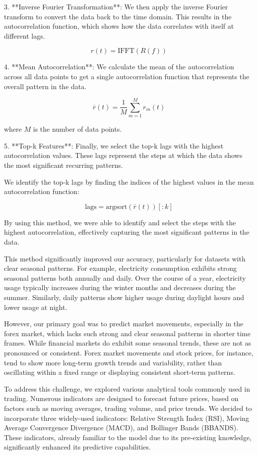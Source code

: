 3. **Inverse Fourier Transformation**: We then apply the inverse Fourier transform to convert the data back to the time domain. This results in the autocorrelation function, which shows how the data correlates with itself at different lags.

\[
	r(t) = \text{IFFT}(R(f))
\]

4. **Mean Autocorrelation**: We calculate the mean of the autocorrelation across all data points to get a single autocorrelation function that represents the overall pattern in the data.

\[
	\bar{r}(t) = \frac{1}{M} \sum_{m=1}^{M} r_m(t)
\]

where \( M \) is the number of data points.

5. **Top-k Features**: Finally, we select the top-k lags with the highest autocorrelation values. These lags represent the steps at which the data shows the most significant recurring patterns.

We identify the top-k lags by finding the indices of the highest values in the mean autocorrelation function:

\[
	\text{lags} = \text{argsort}(\bar{r}(t))[:k]
\]

By using this method, we were able to identify and select the steps with the highest autocorrelation, effectively capturing the most significant patterns in the data.

This method significantly improved our accuracy, particularly for datasets with clear seasonal patterns. For example, electricity consumption exhibits strong seasonal patterns both annually and daily. Over the course of a year, electricity usage typically increases during the winter months and decreases during the summer. Similarly, daily patterns show higher usage during daylight hours and lower usage at night.

However, our primary goal was to predict market movements, especially in the forex market, which lacks such strong and clear seasonal patterns in shorter time frames. While financial markets do exhibit some seasonal trends, these are not as pronounced or consistent. Forex market movements and stock prices, for instance, tend to show more long-term growth trends and variability, rather than oscillating within a fixed range or displaying consistent short-term patterns.

To address this challenge, we explored various analytical tools commonly used in trading. Numerous indicators are designed to forecast future prices, based on factors such as moving averages, trading volume, and price trends. We decided to incorporate three widely-used indicators: Relative Strength Index (RSI), Moving Average Convergence Divergence (MACD), and Bollinger Bands (BBANDS). These indicators, already familiar to the model due to its pre-existing knowledge, significantly enhanced its predictive capabilities.


